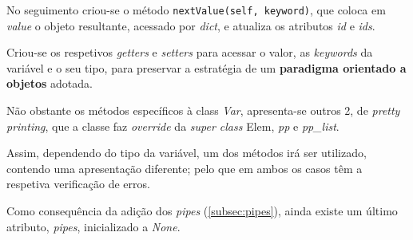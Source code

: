 \documentclass[../relatorio.tex]{subfiles}
\begin{document}
    No seguimento criou-se o método \texttt{nextValue(self, keyword)}, que 
    coloca em \textit{value} o objeto resultante, acessado por \textit{dict}, e 
    atualiza os atributos \textit{id} e \textit{ids}.

    Criou-se os respetivos \textit{getters} e \textit{setters} para acessar o valor, as 
    \textit{keywords} da variável e o seu tipo, para preservar a estratégia de um \textbf{paradigma
    orientado a objetos} adotada.

    Não obstante os métodos específicos à class \textit{Var}, apresenta-se outros 2, de \textit{pretty printing},
    que a classe faz \textit{override} da \textit{super class} Elem, \textit{pp} e \textit{pp\_list}.
    
    Assim, dependendo do tipo da variável, um dos métodos irá ser utilizado, contendo uma 
    apresentação diferente; pelo que em ambos os casos têm a respetiva verificação de erros.

    Como consequência da adição dos \textit{pipes} (\ref{subsec:pipes}), ainda existe um último 
    atributo, \textit{pipes}, inicializado a \textit{None}.
\end{document}
